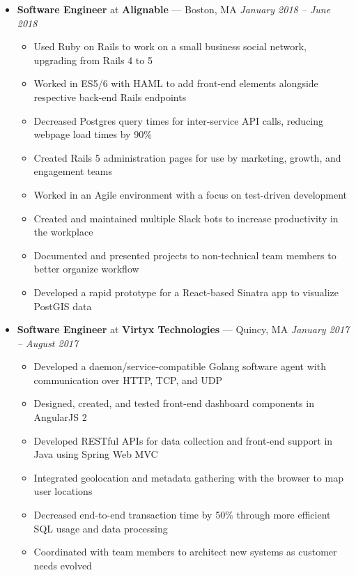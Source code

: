 \documentclass{article}
\begin{document}
\begin{itemize}[label={},leftmargin=*]

\item \textbf{Software Engineer} at \textbf{Alignable} --- Boston, MA \hfill {\em January 2018 -- June 2018}
  \begin{itemize}[label={$\bullet$}]
  \item Used Ruby on Rails to work on a small business social network, upgrading from Rails 4 to 5
  \item Worked in ES5/6 with HAML to add front-end elements alongside respective back-end Rails endpoints
  \item Decreased Postgres query times for inter-service API calls, reducing webpage load times by 90\%
  \item Created Rails 5 administration pages for use by marketing, growth, and engagement teams
  \item Worked in an Agile environment with a focus on test-driven development
  \item Created and maintained multiple Slack bots to increase productivity in the workplace
  \item Documented and presented projects to non-technical team members to better organize workflow
  \item Developed a rapid prototype for a React-based Sinatra app to visualize PostGIS data
  \end{itemize}

\item \textbf{Software Engineer} at \textbf{Virtyx Technologies} --- Quincy, MA \hfill {\em January 2017 -- August 2017}
  \begin{itemize}[label={$\bullet$}]
  \item Developed a daemon/service-compatible Golang software agent with communication over HTTP, TCP, and UDP
  \item Designed, created, and tested front-end dashboard components in AngularJS 2
  \item Developed RESTful APIs for data collection and front-end support in Java using Spring Web MVC
  \item Integrated geolocation and metadata gathering with the browser to map user locations
  \item Decreased end-to-end transaction time by 50\% through more efficient SQL usage and data processing
  \item Coordinated with team members to architect new systems as customer needs evolved
  \end{itemize}


\end{itemize}
\end{document}
